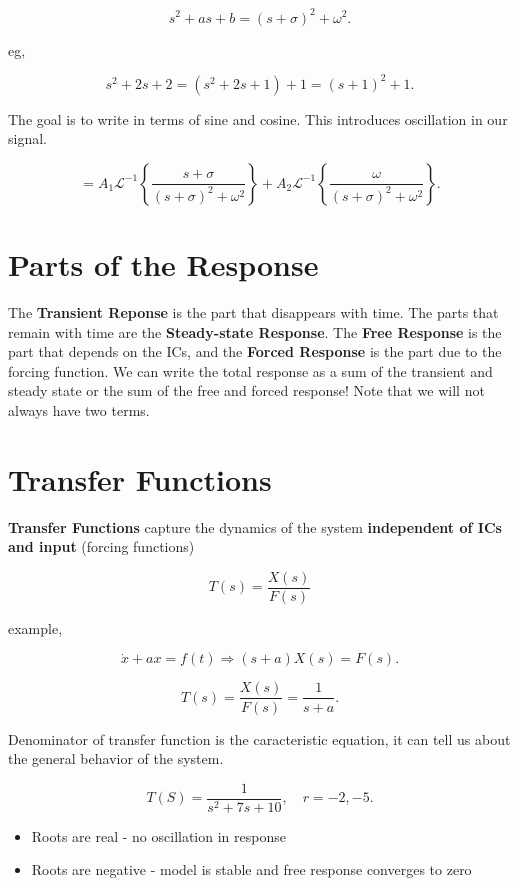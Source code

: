 \documentclass[12pt, a4paper]{report}
\begin{document}
  \[
      s ^2 + as + b = (s + \sigma) ^2 + \omega ^2
    .\]

  eg,

  \[
      s ^2 + 2s + 2 = (s ^2 + 2s + 1) + 1 = (s + 1) ^2 + 1
    .\]

  The goal is to write in terms of sine and cosine. This introduces oscillation in our signal.

  \[
      = A_1 \mathcal{L}^{-1}\left\{\frac{s + \sigma}{(s + \sigma) ^2 + \omega ^2}\right\} + A_2 \mathcal{L}^{-1}\left\{\frac{\omega}{(s + \sigma) ^2 + \omega ^2}\right\}
    .\]

  \section{Parts of the Response}

  The \textbf{Transient Reponse} is the part that disappears with time. The parts that remain with time are the \textbf{Steady-state Response}. The \textbf{Free Response} is the part that depends on the ICs, and the \textbf{Forced Response} is the part due to the forcing function. We can write the total response as a sum of the transient and steady state or the sum of the free and forced response! Note that we will not always have two terms.

  \section{Transfer Functions}

  \textbf{Transfer Functions} capture the dynamics of the system \textbf{independent of ICs and input} (forcing functions)

  \begin{equation}
    T(s) = \frac{X(s)}{F(s)}
  \end{equation}

  example,

  \[
      \dot x + ax = f(t) \Rightarrow (s+a)X(s) = F(s)
    .\]

  \[
      T(s) = \frac{X(s)}{F(s)} = \frac{1}{s+a}
    .\]

  Denominator of transfer function is the caracteristic equation, it can tell us about the general behavior of the system.

  \[
      T(S) = \frac{1}{s ^2 + 7s + 10}, \quad r = -2, -5
    .\]

  \begin{itemize}
    \item Roots are real - no oscillation in response
    \item Roots are negative - model is stable and free response converges to zero
  \end{itemize}
\end{document}
